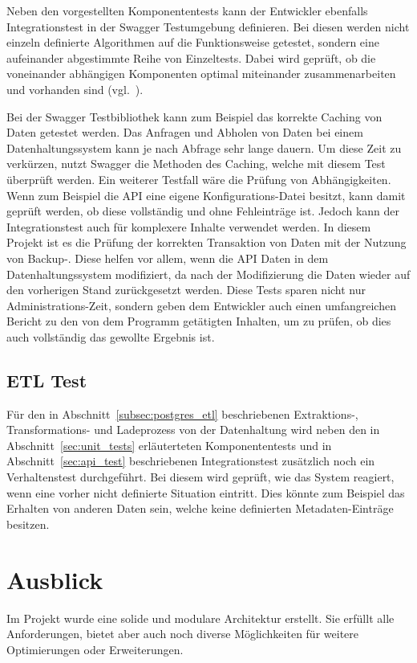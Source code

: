 Neben den vorgestellten Komponententests kann der Entwickler ebenfalls
Integrationstest in der Swagger Testumgebung definieren. Bei diesen werden
nicht einzeln definierte Algorithmen auf die Funktionsweise getestet, sondern
eine aufeinander abgestimmte Reihe von Einzeltests. Dabei wird geprüft, ob die
voneinander abhängigen Komponenten optimal miteinander zusammenarbeiten und
vorhanden sind (vgl.~\cite{Spring_Testing}).

Bei der Swagger Testbibliothek kann zum Beispiel das korrekte Caching von Daten
getestet werden. Das Anfragen und Abholen von Daten bei einem
Datenhaltungssystem kann je nach Abfrage sehr lange dauern. Um diese Zeit zu
verkürzen, nutzt Swagger die Methoden des Caching, welche mit diesem Test
überprüft werden. Ein weiterer Testfall wäre die Prüfung von Abhängigkeiten.
Wenn zum Beispiel die \gls{API} eine eigene Konfigurations\hyp{}Datei besitzt,
kann damit geprüft werden, ob diese vollständig und ohne Fehleinträge ist.
Jedoch kann der Integrationstest auch für komplexere Inhalte verwendet werden.
In diesem Projekt ist es die Prüfung der korrekten \gls{Transaktion} von Daten
mit der Nutzung von Backup\hyp{}. Diese
helfen vor allem, wenn die \gls{API} Daten in dem Datenhaltungssystem
modifiziert, da nach der Modifizierung die Daten wieder auf den vorherigen
Stand zurückgesetzt werden. Diese Tests sparen nicht nur
Administrations\hyp{}Zeit, sondern geben dem Entwickler auch einen
umfangreichen Bericht zu den von dem Programm getätigten Inhalten, um zu
prüfen, ob dies auch vollständig das gewollte Ergebnis ist.
\nl%

\section{ETL Test}
\label{sec:etl_test}
Für den in Abschnitt~\ref{subsec:postgres_etl} beschriebenen Extraktions-,
Transformations- und Ladeprozess von der Datenhaltung wird neben den in
Abschnitt~\ref{sec:unit_tests} erläuterteten Komponententests und in
Abschnitt~\ref{sec:api_test} beschriebenen Integrationstest zusätzlich noch ein
Verhaltenstest durchgeführt. Bei diesem wird geprüft, wie das System reagiert,
wenn eine vorher nicht definierte Situation eintritt. Dies könnte zum Beispiel
das Erhalten von anderen Daten sein, welche keine definierten
Metadaten\hyp{}Einträge besitzen.
\nl%

\chapter{Ausblick}
\label{chapter:ausblick}
Im Projekt wurde eine solide und modulare Architektur erstellt. Sie erfüllt
alle Anforderungen, bietet aber auch noch diverse Möglichkeiten für weitere
Optimierungen oder Erweiterungen.
\tm%

